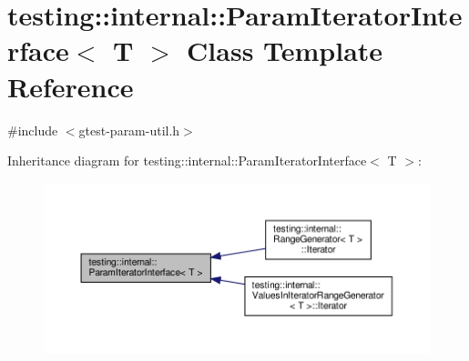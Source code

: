 \hypertarget{classtesting_1_1internal_1_1ParamIteratorInterface}{}\section{testing\+:\+:internal\+:\+:Param\+Iterator\+Interface$<$ T $>$ Class Template Reference}
\label{classtesting_1_1internal_1_1ParamIteratorInterface}


{\ttfamily \#include $<$gtest-\/param-\/util.\+h$>$}



Inheritance diagram for testing\+:\+:internal\+:\+:Param\+Iterator\+Interface$<$ T $>$\+:\nopagebreak
\begin{figure}[H]
\begin{center}
\leavevmode
\includegraphics[width=350pt]{classtesting_1_1internal_1_1ParamIteratorInterface__inherit__graph}
\end{center}
\end{figure}
